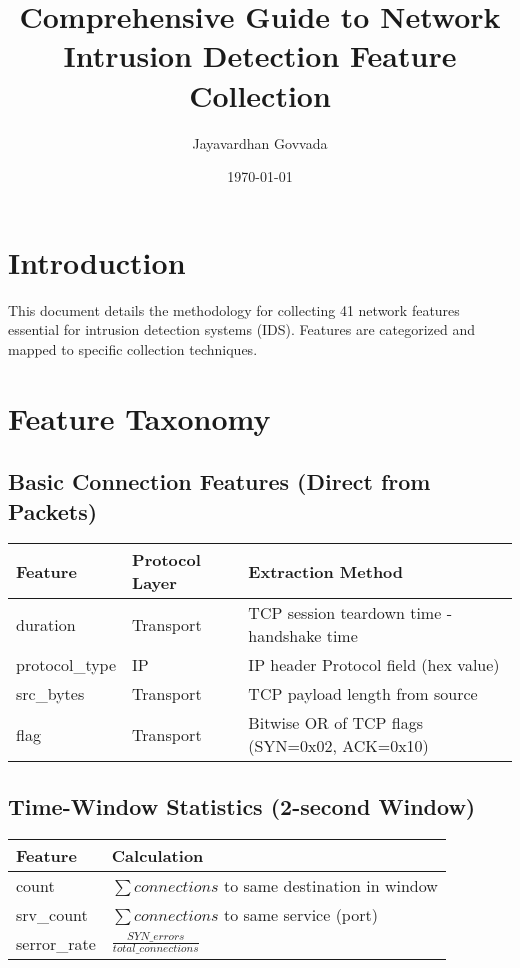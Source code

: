 \documentclass{article}
\title{Comprehensive Guide to Network Intrusion Detection Feature Collection}
\author{Jayavardhan Govvada}
\date{\today}
\begin{document}
\maketitle

\section{Introduction}
This document details the methodology for collecting 41 network features essential for intrusion detection systems (IDS). Features are categorized and mapped to specific collection techniques.

\section{Feature Taxonomy}
\subsection{Basic Connection Features (Direct from Packets)}
\begin{tabularx}{\textwidth}{llX}
    \toprule
    \textbf{Feature} & \textbf{Protocol Layer} & \textbf{Extraction Method} \\
    \midrule
    duration & Transport & TCP session teardown time - handshake time \\
    protocol\_type & IP & IP header Protocol field (hex value) \\
    src\_bytes & Transport & TCP payload length from source \\
    flag & Transport & Bitwise OR of TCP flags (SYN=0x02, ACK=0x10) \\
    \bottomrule
\end{tabularx}

\subsection{Time-Window Statistics (2-second Window)}
\begin{tabularx}{\textwidth}{lX}
    \toprule
    \textbf{Feature} & \textbf{Calculation} \\
    \midrule
    count & $\sum connections$ to same destination in window \\
    srv\_count & $\sum connections$ to same service (port) \\
    serror\_rate & $\frac{SYN\_errors}{total\_connections}$ \\
    \bottomrule
\end{tabularx}
\end{document}
